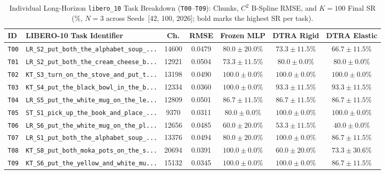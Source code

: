 \documentclass[10pt]{article}
\newcommand{\tblfont}{\fontsize{8.5pt}{10.4pt}\selectfont}
\begin{document}
\begin{table}[ht!]
  \centering
  \caption{Individual Long-Horizon \texttt{libero\_10} Task Breakdown (\texttt{T00}--\texttt{T09}): Chunks, $C^2$ B-Spline RMSE, and $K=100$ Final SR (\%, $N=3$ across Seeds~[42, 100, 2026]; bold marks the highest SR per task).}
  \label{tab:libero10_pertask}
  \tblfont
  \setlength{\tabcolsep}{2.6pt}
  \begin{tabular}{l>{\raggedright\arraybackslash}p{}ccccc}
    \toprule
    \textbf{ID} & \textbf{LIBERO-10 Task Identifier} & \textbf{Ch.} & \textbf{RMSE} & \textbf{Frozen MLP} & \textbf{DTRA Rigid} & \textbf{DTRA Elastic} \\
    \midrule
    \texttt{T00} & \texttt{LR\_S2\_put\_both\_the\_alphabet\_soup\_...} & 14600 & 0.0479 & $\mathbf{80.0 \pm 20.0}$\% & $73.3 \pm 11.5$\% & $66.7 \pm 11.5$\% \\
    \texttt{T01} & \texttt{LR\_S2\_put\_both\_the\_cream\_cheese\_b...} & 12921 & 0.0504 & $73.3 \pm 11.5$\% & $\mathbf{80.0 \pm 0.0}$\% & $\mathbf{80.0 \pm 0.0}$\% \\
    \texttt{T02} & \texttt{KT\_S3\_turn\_on\_the\_stove\_and\_put\_t...} & 13198 & 0.0490 & $\mathbf{100.0 \pm 0.0}$\% & $\mathbf{100.0 \pm 0.0}$\% & $\mathbf{100.0 \pm 0.0}$\% \\
    \texttt{T03} & \texttt{KT\_S4\_put\_the\_black\_bowl\_in\_the\_b...} & 12334 & 0.0360 & $\mathbf{100.0 \pm 0.0}$\% & $93.3 \pm 11.5$\% & $93.3 \pm 11.5$\% \\
    \texttt{T04} & \texttt{LR\_S5\_put\_the\_white\_mug\_on\_the\_le...} & 12809 & 0.0501 & $\mathbf{86.7 \pm 11.5}$\% & $\mathbf{86.7 \pm 11.5}$\% & $\mathbf{86.7 \pm 11.5}$\% \\
    \texttt{T05} & \texttt{ST\_S1\_pick\_up\_the\_book\_and\_place\_...} & 9370 & 0.0311 & $80.0 \pm 0.0$\% & $\mathbf{100.0 \pm 0.0}$\% & $\mathbf{100.0 \pm 0.0}$\% \\
    \texttt{T06} & \texttt{LR\_S6\_put\_the\_white\_mug\_on\_the\_pl...} & 12656 & 0.0485 & $\mathbf{60.0 \pm 20.0}$\% & $53.3 \pm 11.5$\% & $40.0 \pm 0.0$\% \\
    \texttt{T07} & \texttt{LR\_S1\_put\_both\_the\_alphabet\_soup\_...} & 13376 & 0.0494 & $80.0 \pm 20.0$\% & $\mathbf{100.0 \pm 0.0}$\% & $86.7 \pm 11.5$\% \\
    \texttt{T08} & \texttt{KT\_S8\_put\_both\_moka\_pots\_on\_the\_s...} & 20694 & 0.0391 & $\mathbf{100.0 \pm 0.0}$\% & $60.0 \pm 20.0$\% & $73.3 \pm 30.6$\% \\
    \texttt{T09} & \texttt{KT\_S6\_put\_the\_yellow\_and\_white\_mu...} & 15132 & 0.0345 & $\mathbf{100.0 \pm 0.0}$\% & $\mathbf{100.0 \pm 0.0}$\% & $86.7 \pm 11.5$\% \\
    \bottomrule
  \end{tabular}
\end{table}
\end{document}
